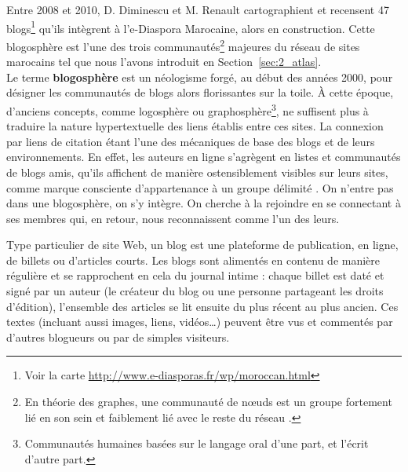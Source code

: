 \documentclass[symmetric,justified,marginals=raggedouter]{tufte-book}
\begin{document}
\noindent Entre 2008 et 2010, D. Diminescu et M. Renault cartographient et recensent 47 blogs\footnote{\RaggedOuter Voir la carte \url{http://www.e-diasporas.fr/wp/moroccan.html}} qu'ils intègrent à l'e-Diaspora Marocaine, alors en construction. Cette blogosphère est l'une des trois communautés\footnote{\RaggedOuter En théorie des graphes, une communauté de nœuds est un groupe fortement lié en son sein et faiblement lié avec le reste du réseau \citep{wasserman_social_1994, scott_social_2017}.} majeures du réseau de sites marocains tel que nous l'avons introduit en Section~\ref{sec:2_atlas}. \\

\noindent Le terme \textbf{blogosphère} est un néologisme forgé, au début des années 2000, pour désigner les communautés de blogs alors florissantes sur la toile. À cette époque, d'anciens concepts, comme logosphère ou graphosphère\footnote{\RaggedOuter Communautés humaines basées sur le langage oral d'une part, et l'écrit d'autre part.}, ne suffisent plus à traduire la nature hypertextuelle des liens établis entre ces sites. La connexion par liens de citation étant l'une des mécaniques de base des blogs et de leurs environnements. En effet, les auteurs en ligne s'agrègent en listes et communautés de blogs amis, qu'ils affichent de manière ostensiblement visibles sur leurs sites, comme marque consciente d'appartenance à un groupe délimité \citep{keren_blogosphere:_2006}. On n'entre pas dans une blogosphère, on s'y intègre. On cherche à la rejoindre en se connectant à ses membres qui, en retour, nous reconnaissent comme l'un des leurs.   

Type particulier de site Web, un blog est une plateforme de publication, en ligne, de billets ou d'articles courts. Les blogs sont alimentés en contenu de manière régulière et se rapprochent en cela du journal intime : chaque billet est daté et signé par un auteur (le créateur du blog ou une personne partageant les droits d'édition), l'ensemble des articles se lit ensuite du plus récent au plus ancien. Ces textes (incluant aussi images, liens, vidéos\ldots{}) peuvent être vus et commentés par d'autres blogueurs ou par de simples visiteurs. 
\end{document}
